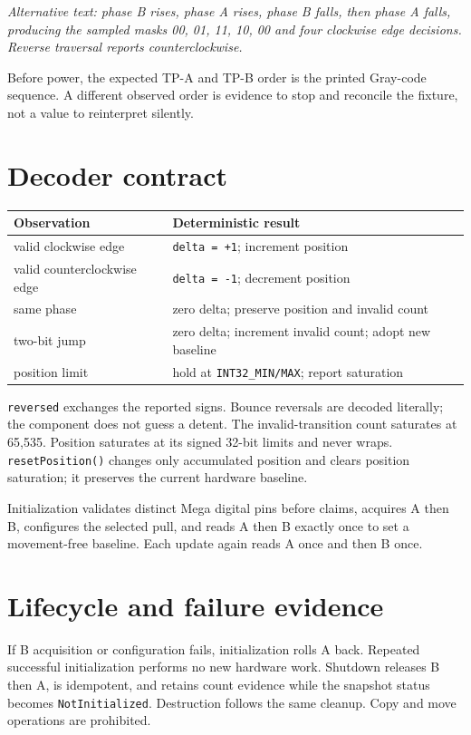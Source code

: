 \documentclass[11pt]{article}
\begin{document}
\textit{Alternative text: phase B rises, phase A rises, phase B falls, then
phase A falls, producing the sampled masks 00, 01, 11, 10, 00 and four
clockwise edge decisions. Reverse traversal reports counterclockwise.}

Before power, the expected TP-A and TP-B order is the printed Gray-code
sequence. A different observed order is evidence to stop and reconcile the
fixture, not a value to reinterpret silently.

\section{Decoder contract}

\begin{tabularx}{\linewidth}{@{}l X@{}}
\toprule
Observation & Deterministic result\\
\midrule
valid clockwise edge & \texttt{delta = +1}; increment position\\
valid counterclockwise edge & \texttt{delta = -1}; decrement position\\
same phase & zero delta; preserve position and invalid count\\
two-bit jump & zero delta; increment invalid count; adopt new baseline\\
position limit & hold at \texttt{INT32\_MIN/MAX}; report saturation\\
\bottomrule
\end{tabularx}

\texttt{reversed} exchanges the reported signs. Bounce reversals are decoded
literally; the component does not guess a detent. The invalid-transition count
saturates at 65,535. Position saturates at its signed 32-bit limits and never
wraps. \texttt{resetPosition()} changes only accumulated position and clears
position saturation; it preserves the current hardware baseline.

Initialization validates distinct Mega digital pins before claims, acquires A
then B, configures the selected pull, and reads A then B exactly once to set a
movement-free baseline. Each update again reads A once and then B once.

\section{Lifecycle and failure evidence}

If B acquisition or configuration fails, initialization rolls A back.
Repeated successful initialization performs no new hardware work. Shutdown
releases B then A, is idempotent, and retains count evidence while the
snapshot status becomes \texttt{NotInitialized}. Destruction follows the same
cleanup. Copy and move operations are prohibited.
\end{document}
